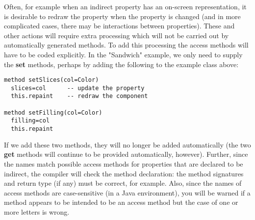Often, for example when an indirect property has an on-screen
representation, it is desirable to redraw the property when the property
is changed (and in more complicated cases, there may be interactions
between properties).
These and other actions will require extra processing which will not be
carried out by automatically generated methods.  To add this processing
the access methods will have to be coded explicitly.  In the
"Sandwich" example, we only need to supply the \textbf{set}
methods, perhaps by adding the following to the example class above:
\begin{lstlisting}[label=setslices,caption=setSlices]
method setSlices(col=Color)
  slices=col      -- update the property
  this.repaint    -- redraw the component

method setFilling(col=Color)
  filling=col
  this.repaint
\end{lstlisting}
If we add these two methods, they will no longer be added
automatically (the two \textbf{get} methods will continue to be
provided automatically, however).  Further, since the names match
possible access methods for properties that are declared to be indirect,
the compiler will check the method declaration: the method signatures
and return type (if any) must be correct, for example.  Also, since the
names of access methods are case-sensitive (in a Java environment), you
will be warned if a method appears to be intended to be an access method
but the case of one or more letters is wrong.
 
